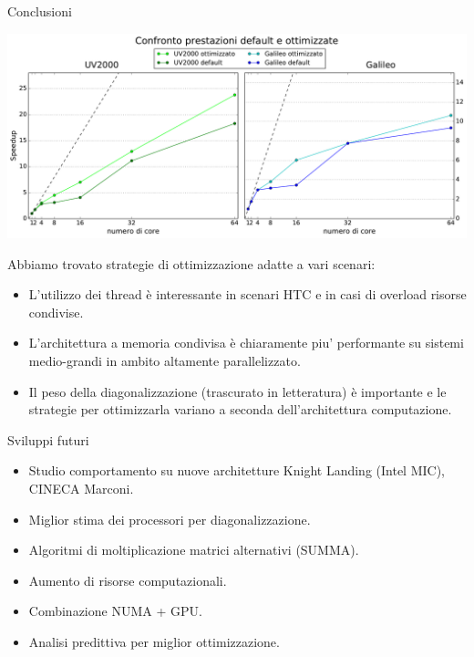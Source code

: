 \documentclass[8pt]{beamer}
\begin{document}
\begin{frame}{Conclusioni}
\begin{center}
	\includegraphics[height=0.5\textheight]{beam_results_arch_comparison.pdf}	
\end{center}


Abbiamo trovato strategie di ottimizzazione adatte a vari scenari:

\begin{itemize}

	\item L'utilizzo dei thread \`e interessante in scenari HTC e in casi di overload risorse condivise.
	\pause
	\item L'architettura a memoria condivisa \`e chiaramente piu' performante su sistemi medio-grandi in ambito altamente parallelizzato.
	\pause
	\item Il peso della diagonalizzazione (trascurato in letteratura) \`e importante e le strategie per ottimizzarla variano a seconda dell'architettura computazione.
\end{itemize}
\end{frame}

\begin{frame}{Sviluppi futuri}
	\begin{itemize}
		\item Studio comportamento su nuove architetture Knight Landing (Intel MIC), CINECA Marconi.
		\item Miglior stima dei processori per diagonalizzazione.
		\item Algoritmi di moltiplicazione matrici alternativi (SUMMA).
		\item Aumento di risorse computazionali.
		\item Combinazione NUMA + GPU.
		\item Analisi predittiva per miglior ottimizzazione.
	\end{itemize}
\end{frame}
\end{document}
